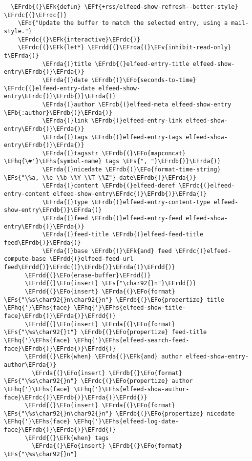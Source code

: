 \documentclass[a4wide,10pt]{article}
\newcommand{\EFs}[1]{\textcolor{EFs}{#1}} %
\newcommand{\EFd}[1]{\textcolor{EFd}{#1}} %
\newcommand{\EFk}[1]{\textcolor{EFk}{#1}} %
\newcommand{\EFb}[1]{\textcolor{EFb}{#1}} %
\newcommand{\EFf}[1]{\textcolor{EFf}{#1}} %
\newcommand{\EFv}[1]{\textcolor{EFv}{#1}} %
\newcommand{\EFo}[1]{\textcolor{EFo}{#1}} %
\newcommand{\EFhq}[1]{\textcolor{EFhq}{#1}} %
\newcommand{\EFhs}[1]{\textcolor{EFhs}{#1}} %
\newcommand{\EFrda}[1]{\textcolor{EFrda}{#1}} %
\newcommand{\EFrdb}[1]{\textcolor{EFrdb}{#1}} %
\newcommand{\EFrdc}[1]{\textcolor{EFrdc}{#1}} %
\newcommand{\EFrdd}[1]{\textcolor{EFrdd}{#1}} %
\begin{document}
\begin{Code}
\begin{Verbatim}
  \EFrdb{(}\EFk{defun} \EFf{+rss/elfeed-show-refresh--better-style} \EFrdc{(}\EFrdc{)}
    \EFd{"Update the buffer to match the selected entry, using a mail-style."}
    \EFrdc{(}\EFk{interactive}\EFrdc{)}
    \EFrdc{(}\EFk{let*} \EFrdd{(}\EFrda{(}\EFv{inhibit-read-only} t\EFrda{)}
           \EFrda{(}title \EFrdb{(}elfeed-entry-title elfeed-show-entry\EFrdb{)}\EFrda{)}
           \EFrda{(}date \EFrdb{(}\EFo{seconds-to-time} \EFrdc{(}elfeed-entry-date elfeed-show-entry\EFrdc{)}\EFrdb{)}\EFrda{)}
           \EFrda{(}author \EFrdb{(}elfeed-meta elfeed-show-entry \EFb{:author}\EFrdb{)}\EFrda{)}
           \EFrda{(}link \EFrdb{(}elfeed-entry-link elfeed-show-entry\EFrdb{)}\EFrda{)}
           \EFrda{(}tags \EFrdb{(}elfeed-entry-tags elfeed-show-entry\EFrdb{)}\EFrda{)}
           \EFrda{(}tagsstr \EFrdb{(}\EFo{mapconcat} \EFhq{\#'}\EFhs{symbol-name} tags \EFs{", "}\EFrdb{)}\EFrda{)}
           \EFrda{(}nicedate \EFrdb{(}\EFo{format-time-string} \EFs{"\%a, \%e \%b \%Y \%T \%Z"} date\EFrdb{)}\EFrda{)}
           \EFrda{(}content \EFrdb{(}elfeed-deref \EFrdc{(}elfeed-entry-content elfeed-show-entry\EFrdc{)}\EFrdb{)}\EFrda{)}
           \EFrda{(}type \EFrdb{(}elfeed-entry-content-type elfeed-show-entry\EFrdb{)}\EFrda{)}
           \EFrda{(}feed \EFrdb{(}elfeed-entry-feed elfeed-show-entry\EFrdb{)}\EFrda{)}
           \EFrda{(}feed-title \EFrdb{(}elfeed-feed-title feed\EFrdb{)}\EFrda{)}
           \EFrda{(}base \EFrdb{(}\EFk{and} feed \EFrdc{(}elfeed-compute-base \EFrdd{(}elfeed-feed-url feed\EFrdd{)}\EFrdc{)}\EFrdb{)}\EFrda{)}\EFrdd{)}
      \EFrdd{(}\EFo{erase-buffer}\EFrdd{)}
      \EFrdd{(}\EFo{insert} \EFs{"\char92{}n"}\EFrdd{)}
      \EFrdd{(}\EFo{insert} \EFrda{(}\EFo{format} \EFs{"\%s\char92{}n\char92{}n"} \EFrdb{(}\EFo{propertize} title \EFhq{'}\EFhs{face} \EFhq{'}\EFhs{elfeed-show-title-face}\EFrdb{)}\EFrda{)}\EFrdd{)}
      \EFrdd{(}\EFo{insert} \EFrda{(}\EFo{format} \EFs{"\%s\char92{}t"} \EFrdb{(}\EFo{propertize} feed-title \EFhq{'}\EFhs{face} \EFhq{'}\EFhs{elfeed-search-feed-face}\EFrdb{)}\EFrda{)}\EFrdd{)}
      \EFrdd{(}\EFk{when} \EFrda{(}\EFk{and} author elfeed-show-entry-author\EFrda{)}
        \EFrda{(}\EFo{insert} \EFrdb{(}\EFo{format} \EFs{"\%s\char92{}n"} \EFrdc{(}\EFo{propertize} author \EFhq{'}\EFhs{face} \EFhq{'}\EFhs{elfeed-show-author-face}\EFrdc{)}\EFrdb{)}\EFrda{)}\EFrdd{)}
      \EFrdd{(}\EFo{insert} \EFrda{(}\EFo{format} \EFs{"\%s\char92{}n\char92{}n"} \EFrdb{(}\EFo{propertize} nicedate \EFhq{'}\EFhs{face} \EFhq{'}\EFhs{elfeed-log-date-face}\EFrdb{)}\EFrda{)}\EFrdd{)}
      \EFrdd{(}\EFk{when} tags
        \EFrda{(}\EFo{insert} \EFrdb{(}\EFo{format} \EFs{"\%s\char92{}n"}

\end{Verbatim}
\end{Code}
\end{document}

